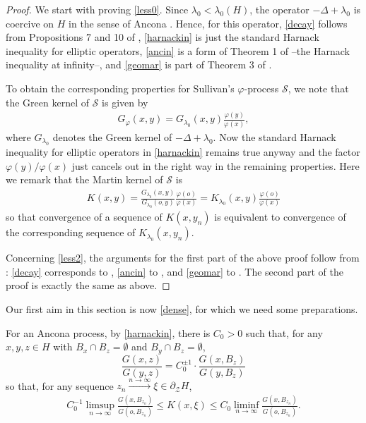 \documentclass[12pt,a4paper]{amsart}
\numberwithin{equation}{section}
\theoremstyle{definition}
\def\vf{\varphi}
\begin{document}
\begin{proof}
We start with proving \eqref{less0}.
Since $\lambda_0<\lambda_0(H)$, the operator $-\Delta+\lambda_0$ is coercive on $H$ in the sense of Ancona \cite[Section 1]{An}.
Hence, for this operator, \ref{decay} follows from Propositions 7 and 10 of \cite{An},
\ref{harnackin} is just the standard Harnack inequality for elliptic operators,
\ref{ancin} is a form of Theorem 1 of \cite{An}--the Harnack inequality at infinity--,
and \ref{geomar} is part of Theorem 3 of \cite{An}.

To obtain the corresponding properties for Sullivan's $\vf$-process $\mathcal S$, we note that the Green kernel of $\mathcal S$ is given by
\begin{align}
    G_\varphi(x,y) = G_{\lambda_0}(x,y)\frac{\vf(y)}{\vf(x)},
\end{align}
where $G_{\lambda_0}$ denotes the Green kernel of $-\Delta+\lambda_0$.
Now the standard Harnack inequality for elliptic operators in \ref{harnackin} remains true anyway and the factor $\vf(y)/\vf(x)$ just cancels out in the right way in the remaining properties.
Here we remark that the Martin kernel of $\mathcal S$ is
\begin{align}
    K(x,y) = \frac{G_{\lambda_0}(x,y)}{G_{\lambda_0}(o,y)}\frac{\vf(o)}{\vf(x)} = K_{\lambda_0}(x,y)\frac{\vf(o)}{\vf(x)}
\end{align}
so that convergence of a sequence of $K(x,y_n)$ is equivalent to convergence of the corresponding sequence of $K_{\lambda_0}(x,y_n)$.

Concerning \eqref{less2}, the arguments for the first part of the above proof follow from \cite{LL}:
\ref{decay} corresponds to \cite[Theorem 1.3]{LL}, \ref{ancin} to \cite[Theorem 3.2]{LL}, and \ref{geomar} to \cite[Theorem 1.4]{LL}.
The second part of the proof is exactly the same as above.
\end{proof}

Our first aim in this section is now \cref{dense}, for which we need some preparations.

For an Ancona process, by \eqref{harnackin}, there is $C_0>0$ such that, for any $x,y,z\in H$ with $B_x\cap B_z=\emptyset$ and $B_{y}\cap B_z=\emptyset$,
\begin{equation}\label{Mapprox}
    \frac{G(x,z)}{G(y,z)}= C_0^{\pm 1}\cdot\frac{G(x,B_z)}{G(y,B_z)}
\end{equation}
so that, for any sequence $z_n\xrightarrow{n\to\infty}\xi\in\partial_{\mathcal{Z}}H$,
\begin{align*}
  C_0^{-1}\limsup_{n\to\infty} \frac{G(x,B_{z_n})}{G(o,B_{z_n})}\leq K(x,\xi)\leq C_0\liminf_{n\to\infty} \frac{G(x,B_{z_n})}{G(o,B_{z_n})}.
\end{align*}
\end{document}
